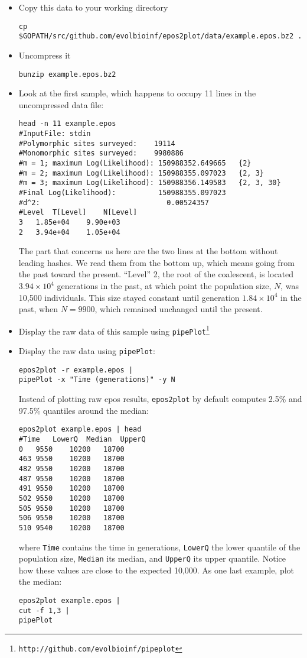 \documentclass[a4paper]{article}
\newcommand{\ty}{\texttt}
\begin{document}
\begin{itemize}
\item Copy this data to your working directory
\begin{verbatim}
cp $GOPATH/src/github.com/evolbioinf/epos2plot/data/example.epos.bz2 .
\end{verbatim}
\item Uncompress it
\begin{verbatim}
bunzip example.epos.bz2
\end{verbatim}
\item Look at the first sample, which happens to occupy 11 lines in
  the uncompressed data file:
\begin{verbatim}
head -n 11 example.epos 
#InputFile:	stdin
#Polymorphic sites surveyed:	19114
#Monomorphic sites surveyed:	9980886
#m = 1; maximum Log(Likelihood): 150988352.649665	{2}
#m = 2; maximum Log(Likelihood): 150988355.097023	{2, 3}
#m = 3; maximum Log(Likelihood): 150988356.149583	{2, 3, 30}
#Final Log(Likelihood):          150988355.097023
#d^2:                              0.00524357
#Level	T[Level]	N[Level]
3	1.85e+04	9.90e+03
2	3.94e+04	1.05e+04
\end{verbatim}
The part that concerns us here are the two lines at the bottom without
leading hashes. We read them from the bottom up, which means going
from the past toward the present. ``Level'' 2, the root of the
coalescent, is located $3.94\times 10^4$ generations in the past, at
which point the population size, $N$, was 10,500 individuals. This
size stayed constant until generation $1.84\times 10^4$ in the past,
when $N=9900$, which remained unchanged until the present.

\item Display the raw data of this sample using \ty{pipePlot}\footnote{\ty{http://github.com/evolbioinf/pipeplot}}

\item Display the raw data using {\ty{pipePlot}}:
\begin{verbatim}
epos2plot -r example.epos |
pipePlot -x "Time (generations)" -y N
\end{verbatim}
Instead of plotting raw epos results, \ty{epos2plot} by default
computes 2.5\% and 97.5\% quantiles around the median:
\begin{verbatim}
epos2plot example.epos | head
#Time	LowerQ	Median	UpperQ
0	9550	10200	18700
463	9550	10200	18700
482	9550	10200	18700
487	9550	10200	18700
491	9550	10200	18700
502	9550	10200	18700
505	9550	10200	18700
506	9550	10200	18700
510	9540	10200	18700
\end{verbatim}
where \ty{Time} contains the time in generations, \ty{LowerQ} the
lower quantile of the population size, \ty{Median} its median, and
\ty{UpperQ} its upper quantile. Notice how these values are close to
the expected 10,000. As one last example, plot the median:
\begin{verbatim}
epos2plot example.epos |
cut -f 1,3 |
pipePlot
\end{verbatim}
\end{itemize}

\end{document}
